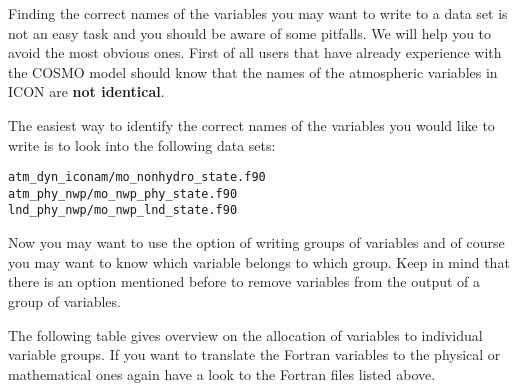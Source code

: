 Finding the correct names of the variables you may want to write to a data set is not an easy task and you should be aware of some pitfalls. We will help you to avoid the most obvious ones. First of all users that have already experience with the COSMO model should know that the names of the atmospheric variables in ICON are \textbf{not identical}. 

The easiest way to identify the correct names of the variables you would like to write is to look into the following data sets:

\begin{Verbatim}[frame=single]
atm_dyn_iconam/mo_nonhydro_state.f90
atm_phy_nwp/mo_nwp_phy_state.f90
lnd_phy_nwp/mo_nwp_lnd_state.f90
\end{Verbatim}

Now you may want to use the option of writing groups of variables and of course you may want to know which variable belongs to which group.
Keep in mind that there is an option mentioned before to remove variables from the output of a group of variables.

The following table gives overview on the allocation of variables to individual variable groups. If you want to translate the Fortran variables to the physical or mathematical ones again have a look to the Fortran files listed above.

